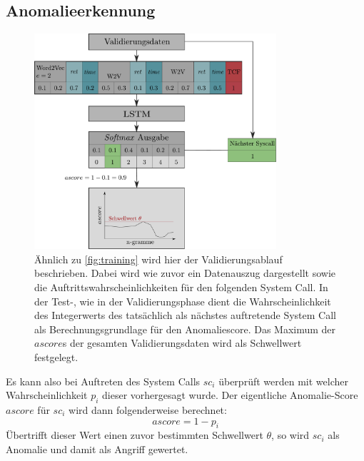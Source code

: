        \subsection{Anomalieerkennung}\label{sec:Anomalieerkennung}
            \begin{figure}[ht]
                \centering
                \includegraphics[width=0.8\textwidth]{images/Validation_overview.pdf}
                \caption[Algorithmus - Ablauf Validierungsphase]{Ähnlich zu \autoref{fig:training} wird hier der Validierungsablauf beschrieben.
                         Dabei wird wie zuvor ein Datenauszug dargestellt sowie die Auftrittswahrscheinlichkeiten für den folgenden System Call.
                         In der Test-, wie in der Validierungsphase dient die Wahrscheinlichkeit des Integerwerts des tatsächlich als nächstes auftretende System Call als Berechnungsgrundlage für den Anomaliescore.
                        Das Maximum der $ascore$s der gesamten Validierungsdaten wird als Schwellwert festgelegt.}
                \label{fig:validierung}
            \end{figure}
            Es kann also bei Auftreten des System Calls $sc_i$ überprüft werden mit welcher Wahrscheinlichkeit $p_i$ dieser vorhergesagt wurde.
            Der eigentliche Anomalie-Score $ascore$ für $sc_i$ wird dann folgenderweise berechnet:
            \begin{equation}
                ascore = 1 - p_i
            \end{equation}
            Übertrifft dieser Wert einen zuvor bestimmten Schwellwert $\theta$, so wird $sc_i$ als Anomalie und damit als Angriff gewertet.

